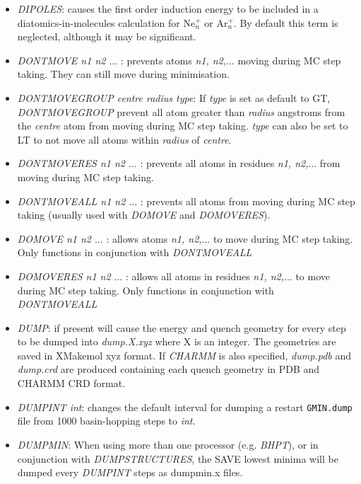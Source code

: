 \documentclass[12pt,a4paper,dvips]{article}
\begin{document}
\begin{itemize}
\item {\it DIPOLES\/}: causes the first order induction energy to be included
in a diatomics-in-molecules calculation for Ne$^+_n$ or Ar$^+_n$. By default this
term is neglected, although it may be significant.

\item {\it DONTMOVE n1 n2 $\ldots$ \/}: prevents atoms {\it n1, n2,$\ldots$} moving during MC step taking. They can still move during minimisation.

\item {\it DONTMOVEGROUP centre radius type\/}: If {\it type} is set as default to {\textrm GT}, {\it DONTMOVEGROUP\/} prevent all atom greater than {\it radius} angstroms from the {\it centre} atom from moving during MC step taking. {\it type} can also be set to LT to not move all atoms within {\it radius} of {\it centre}.

\item {\it DONTMOVERES n1 n2 $\ldots$ \/}: prevents all atoms in residues {\it n1, n2,$\ldots$} from moving during MC step taking.

\item {\it DONTMOVEALL n1 n2 $\ldots$ \/}: prevents all atoms from moving during MC step taking (usually used with {\it DOMOVE} and {\it DOMOVERES}). 

\item {\it DOMOVE n1 n2 $\ldots$ \/}: allows atoms {\it n1, n2,$\ldots$} to move during MC step taking. Only functions in conjunction with 
{\it DONTMOVEALL\/}

\item {\it DOMOVERES n1 n2 $\ldots$ \/}: allows all atoms in residues {\it n1, n2,$\ldots$} to move during MC step taking. Only functions in conjunction 
with {\it DONTMOVEALL\/}

\item {\it DUMP\/}: if present will cause the energy and quench geometry for every step
to be dumped into {\it dump.X.xyz\/} where X is an integer. The geometries are saved 
in XMakemol xyz format. If {\it CHARMM\/} is also specified, {\it dump.pdb\/} and {\it dump.crd\/}
are produced containing each quench geometry in PDB and CHARMM CRD format.

\item {\it DUMPINT int\/}: changes the default interval for dumping a restart 
{\tt GMIN.dump} file from 1000 basin-hopping steps to {\it int\/}.

\item {\it DUMPMIN\/}: When using more than one processor (e.g. {\it BHPT\/}), or in conjunction with {\it DUMPSTRUCTURES\/}, the SAVE lowest minima will be dumped every 
{\it DUMPINT\/} steps as dumpmin.x files. 


\end{itemize}
\end{document}
